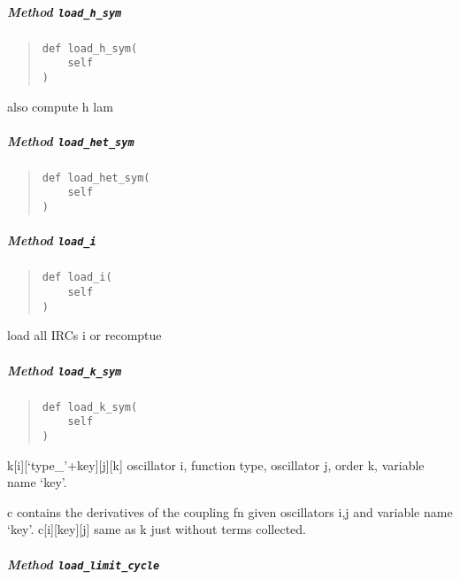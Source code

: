 \documentclass[english,a4paper,oneside]{article}
\let\oldsubparagraph\subparagraph
\renewcommand{\subparagraph}[1]{\oldsubparagraph{#1}\mbox{}}
\begin{document}
\hypertarget{nBodyCoupling.nBodyCoupling.load_h_sym}{%
\subparagraph{\texorpdfstring{Method
\texttt{load\_h\_sym}}{Method load\_h\_sym}}\label{nBodyCoupling.nBodyCoupling.load_h_sym}}

\begin{quote}
\begin{verbatim}
def load_h_sym(
    self
)
\end{verbatim}
\end{quote}

also compute h lam

\hypertarget{nBodyCoupling.nBodyCoupling.load_het_sym}{%
\subparagraph{\texorpdfstring{Method
\texttt{load\_het\_sym}}{Method load\_het\_sym}}\label{nBodyCoupling.nBodyCoupling.load_het_sym}}

\begin{quote}
\begin{verbatim}
def load_het_sym(
    self
)
\end{verbatim}
\end{quote}

\hypertarget{nBodyCoupling.nBodyCoupling.load_i}{%
\subparagraph{\texorpdfstring{Method
\texttt{load\_i}}{Method load\_i}}\label{nBodyCoupling.nBodyCoupling.load_i}}

\begin{quote}
\begin{verbatim}
def load_i(
    self
)
\end{verbatim}
\end{quote}

load all IRCs i or recomptue

\hypertarget{nBodyCoupling.nBodyCoupling.load_k_sym}{%
\subparagraph{\texorpdfstring{Method
\texttt{load\_k\_sym}}{Method load\_k\_sym}}\label{nBodyCoupling.nBodyCoupling.load_k_sym}}

\begin{quote}
\begin{verbatim}
def load_k_sym(
    self
)
\end{verbatim}
\end{quote}

k{[}i{]}{[}`type\_'+key{]}{[}j{]}{[}k{]} oscillator i, function type,
oscillator j, order k, variable name `key'.

c contains the derivatives of the coupling fn given oscillators i,j and
variable name `key'. c{[}i{]}{[}key{]}{[}j{]} same as k just without
terms collected.

\hypertarget{nBodyCoupling.nBodyCoupling.load_limit_cycle}{%
\subparagraph{\texorpdfstring{Method
\texttt{load\_limit\_cycle}}{Method load\_limit\_cycle}}\label{nBodyCoupling.nBodyCoupling.load_limit_cycle}}
\end{document}

